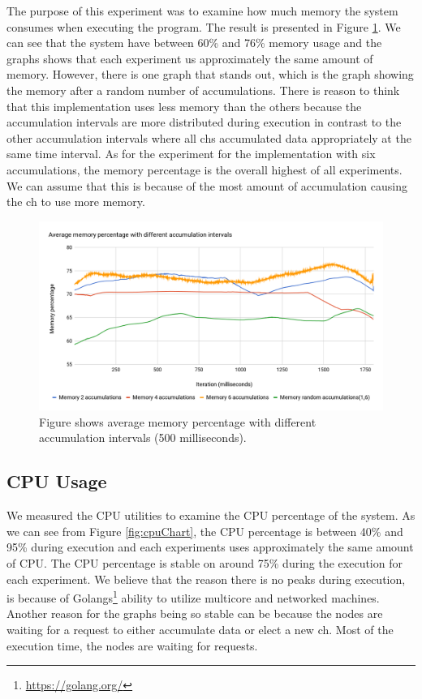 \documentclass[USenglish]{uit-thesis}
\begin{document}
The purpose of this experiment was to examine how much memory the system consumes when executing the program. The result is presented in Figure \ref{fig:memChart}. We can see that the system have between 60\% and 76\% memory usage and the graphs shows that each experiment us approximately the same amount of memory. However, there is one graph that stands out, which is the graph showing the memory after a random number of accumulations.
There is reason to think that this implementation uses less memory than the others because the accumulation intervals are more distributed during execution in contrast to the other accumulation intervals where all \gls{ch}s accumulated data appropriately at the same time interval. As for the experiment for the implementation with six accumulations, the memory percentage is the overall highest of all experiments. We can assume that this is because of the most amount of accumulation causing the \gls{ch} to use more memory.


\begin{figure} [ht]
\centering
\includegraphics[width=\textwidth]{memChart2.png}
\caption{Figure shows average memory percentage with different accumulation intervals (500 milliseconds).}
\label{fig:memChart}
\end{figure}


\subsection{CPU Usage}
We measured the CPU utilities to examine the CPU percentage of the system. As we can see from Figure \ref{fig:cpuChart}, the CPU percentage is between 40\% and 95\% during execution and each experiments uses approximately the same amount of CPU.
The CPU percentage is stable on around 75\% during the execution for each experiment. We believe that the reason there is no peaks during execution, is because of Golangs\footnote{\url{https://golang.org/}} ability to utilize multicore and networked machines. Another reason for the graphs being so stable can be because the nodes are waiting for a request to either accumulate data or elect a new \gls{ch}. Most of the execution time, the nodes are waiting for requests.
\end{document}
